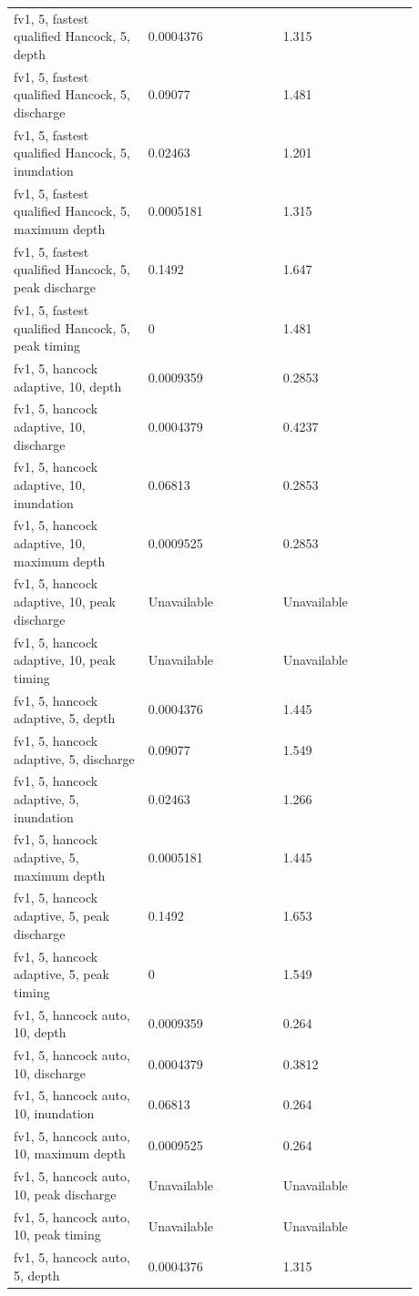 \begin{longtable}{p{0.2933\linewidth}p{0.2933\linewidth}p{0.2933\linewidth}}
fv1, 5, fastest qualified Hancock, 5, depth & 0.0004376 & 1.315 \\
fv1, 5, fastest qualified Hancock, 5, discharge & 0.09077 & 1.481 \\
fv1, 5, fastest qualified Hancock, 5, inundation & 0.02463 & 1.201 \\
fv1, 5, fastest qualified Hancock, 5, maximum depth & 0.0005181 & 1.315 \\
fv1, 5, fastest qualified Hancock, 5, peak discharge & 0.1492 & 1.647 \\
fv1, 5, fastest qualified Hancock, 5, peak timing & 0 & 1.481 \\
fv1, 5, hancock adaptive, 10, depth & 0.0009359 & 0.2853 \\
fv1, 5, hancock adaptive, 10, discharge & 0.0004379 & 0.4237 \\
fv1, 5, hancock adaptive, 10, inundation & 0.06813 & 0.2853 \\
fv1, 5, hancock adaptive, 10, maximum depth & 0.0009525 & 0.2853 \\
fv1, 5, hancock adaptive, 10, peak discharge & Unavailable & Unavailable \\
fv1, 5, hancock adaptive, 10, peak timing & Unavailable & Unavailable \\
fv1, 5, hancock adaptive, 5, depth & 0.0004376 & 1.445 \\
fv1, 5, hancock adaptive, 5, discharge & 0.09077 & 1.549 \\
fv1, 5, hancock adaptive, 5, inundation & 0.02463 & 1.266 \\
fv1, 5, hancock adaptive, 5, maximum depth & 0.0005181 & 1.445 \\
fv1, 5, hancock adaptive, 5, peak discharge & 0.1492 & 1.653 \\
fv1, 5, hancock adaptive, 5, peak timing & 0 & 1.549 \\
fv1, 5, hancock auto, 10, depth & 0.0009359 & 0.264 \\
fv1, 5, hancock auto, 10, discharge & 0.0004379 & 0.3812 \\
fv1, 5, hancock auto, 10, inundation & 0.06813 & 0.264 \\
fv1, 5, hancock auto, 10, maximum depth & 0.0009525 & 0.264 \\
fv1, 5, hancock auto, 10, peak discharge & Unavailable & Unavailable \\
fv1, 5, hancock auto, 10, peak timing & Unavailable & Unavailable \\
fv1, 5, hancock auto, 5, depth & 0.0004376 & 1.315 \\

\end{longtable}
